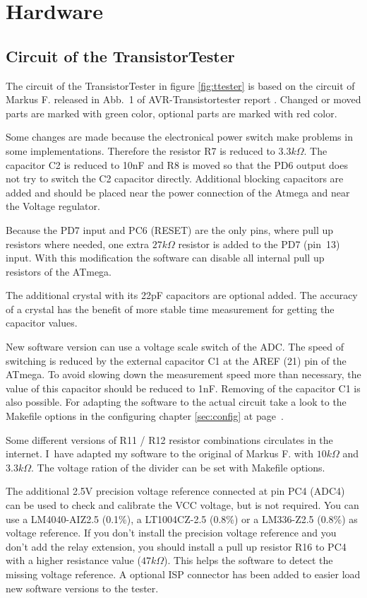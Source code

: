 \chapter{Hardware}

\section{Circuit of the TransistorTester}
\label{sec:hardware}
The circuit of the TransistorTester in figure \ref{fig:ttester} is based on the circuit of
 Markus F. released in Abb.~1 of AVR-Transistortester report \cite{Frejek}.
Changed or moved parts are marked with green color, optional parts are marked with red color.

Some changes are made because the electronical power switch make problems in some implementations.
Therefore the resistor R7 is reduced to \(3.3k\Omega\). The capacitor C2 is reduced to
10nF and R8 is moved so that the PD6 output does not try to switch the C2 capacitor directly.
 Additional blocking capacitors are added and should be placed
near the power connection of the Atmega and near the Voltage regulator.

Because the PD7 input and PC6 (RESET) are the only pins, where pull up resistors where
needed, one extra \(27k\Omega\) resistor is added to the PD7 (pin~13) input. With this modification
the software can disable all internal pull up resistors of the ATmega.

The additional crystal with its 22pF capacitors are optional added. 
The accuracy of a crystal has the benefit of more stable time measurement for getting the
capacitor values.

New software version can use a voltage scale switch of the ADC. The speed of switching is reduced
by the external capacitor C1 at the AREF (21) pin of the ATmega. To avoid slowing down the
measurement speed more than necessary, the value of this capacitor should be reduced to 1nF.
Removing of the capacitor C1 is also possible.
For adapting the software to the actual circuit take a look to the Makefile options in the
configuring chapter \ref{sec:config} at page~\pageref{sec:config}.

Some different versions of R11 / R12 resistor combinations circulates
in the internet. I~have adapted my software to the original of Markus F. \cite{Frejek} with \(10k\Omega\) and \(3.3k\Omega\).
The voltage ration of the divider can be set with Makefile options.

The additional 2.5V precision voltage reference connected at pin PC4 (ADC4) can be used to
check and calibrate the VCC voltage, but is not required. You can use a LM4040-AIZ2.5 (0.1\%),
a LT1004CZ-2.5 (0.8\%) or a LM336-Z2.5 (0.8\%) as voltage reference.
If you don't install the precision voltage reference and you don't add the relay extension,
you should install a pull up resistor R16 to PC4 with a higher resistance value (\(47k\Omega\)).
This helps the software to detect the missing voltage reference.
A optional ISP connector has been added to easier load new software versions to the tester.

